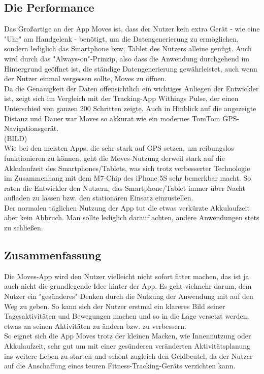 \subsection{Die Performance}
\label{ch:Apps:sec:Moves:subsec:PERF}

Das Großartige an der App Moves ist, dass der Nutzer kein extra Gerät - wie eine "Uhr" am Handgelenk - benötigt, um die Datengenerierung zu ermöglichen, sondern lediglich das Smartphone bzw. Tablet des Nutzers alleine genügt. 
Auch wird durch das "Always-on"-Prinzip, also dass die Anwendung durchgehend im Hintergrund geöffnet ist, die ständige Datengenerierung gewährleistet, auch wenn der Nutzer einmal vergessen sollte, Moves zu öffnen.
\\
Da die Genauigkeit der Daten offensichtlich ein wichtiges Anliegen der Entwickler ist, zeigt sich im Vergleich mit der Tracking-App Withings Pulse, der einen Unterschied von ganzen 200 Schritten zeigte. 
Auch in Hinblick auf die angezeigte Distanz und Dauer war Moves so akkurat wie ein modernes TomTom GPS-Navigationsgerät.
\\
(BILD)
\\
Wie bei den meisten Apps, die sehr stark auf GPS setzen, um reibungslos funktionieren zu können, geht die Moves-Nutzung derweil stark auf die Akkulaufzeit des Smartphones/Tablets, was sich trotz verbesserter Technologie im Zusammenhang mit dem M7-Chip des iPhone 5S sehr bemerkbar macht. 
So raten die Entwickler den Nutzern, das Smartphone/Tablet immer über Nacht aufladen zu lassen bzw. den stationären Einsatz einzustellen.
\\
Der normalen täglichen Nutzung der App tut die etwas verkürzte Akkulaufzeit aber kein Abbruch. 
Man sollte lediglich darauf achten, andere Anwendungen stets zu schließen.

\subsection{Zusammenfassung}
\label{ch:Apps:sec:Moves:subsec:VERDICT} 

Die Moves-App wird den Nutzer vielleicht nicht sofort fitter machen, das ist ja auch nicht die grundlegende Idee hinter der App. 
Es geht vielmehr darum, dem Nutzer ein "gesünderes" Denken durch die Nutzung der Anwendung mit auf den Weg zu geben. 
So kann sich der Nutzer erstmal ein klareres Bild seiner Tagesaktivitäten und Bewegungen machen und so in die Lage versetzt werden, etwas an seinen Aktivitäten zu ändern bzw. zu verbessern.
\\
So eignet sich die App Moves trotz der kleinen Macken, wie Innennutzung oder Akkulaufzeit, sehr gut um mit einer gesünderen veränderten Aktivitätsplanung ins weitere Leben zu starten und schont zugleich den Geldbeutel, da der Nutzer auf die Anschaffung eines teuren Fitness-Tracking-Geräts verzichten kann.

